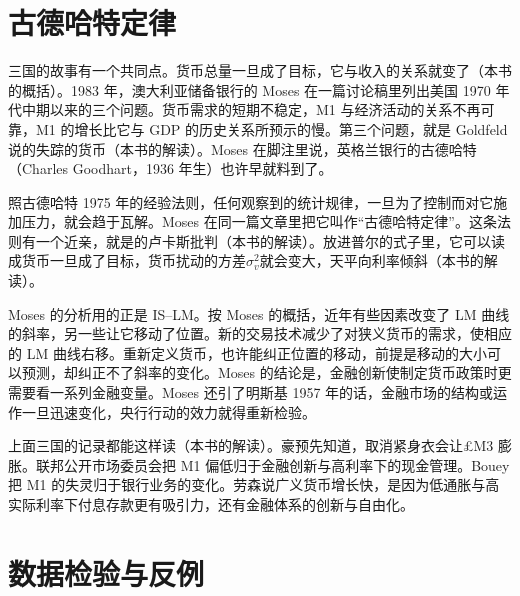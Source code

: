 \section{古德哈特定律}\label{sec:monetarism-goodhart}

三国的故事有一个共同点。货币总量一旦成了目标，它与收入的关系就变了（本书的概括）。1983 年，澳大利亚储备银行的 Moses 在一篇讨论稿里列出美国 1970 年代中期以来的三个问题\cite{moses1983}。货币需求的短期不稳定，M1 与经济活动的关系不再可靠，M1 的增长比它与 GDP 的历史关系所预示的慢\cite{moses1983}。第三个问题，就是 Goldfeld 说的失踪的货币（本书的解读）。Moses 在脚注里说，英格兰银行的古德哈特（Charles Goodhart，1936 年生）也许早就料到了\cite{moses1983,loc45}。

照古德哈特 1975 年的经验法则，任何观察到的统计规律，一旦为了控制而对它施加压力，就会趋于瓦解\cite{moses1983}。Moses 在同一篇文章里把它叫作“古德哈特定律”\cite{moses1983}。这条法则有一个近亲，就是的卢卡斯批判（本书的解读）。放进普尔的式子里，它可以读成货币一旦成了目标，货币扰动的方差$\sigma^{2}_{v}$就会变大，天平向利率倾斜（本书的解读）。

Moses 的分析用的正是 IS–LM\cite{moses1983}。按 Moses 的概括，近年有些因素改变了 LM 曲线的斜率，另一些让它移动了位置\cite{moses1983}。新的交易技术减少了对狭义货币的需求，使相应的 LM 曲线右移\cite{moses1983}。重新定义货币，也许能纠正位置的移动，前提是移动的大小可以预测，却纠正不了斜率的变化\cite{moses1983}。Moses 的结论是，金融创新使制定货币政策时更需要看一系列金融变量\cite{moses1983}。Moses 还引了明斯基 1957 年的话，金融市场的结构或运作一旦迅速变化，央行行动的效力就得重新检验\cite{moses1983}。

上面三国的记录都能这样读（本书的解读）。豪预先知道，取消紧身衣会让£M3 膨胀\cite{hansard1980}。联邦公开市场委员会把 M1 偏低归于金融创新与高利率下的现金管理\cite{fomc1982a}。Bouey 把 M1 的失灵归于银行业务的变化\cite{bouey1982a}。劳森说广义货币增长快，是因为低通胀与高实际利率下付息存款更有吸引力，还有金融体系的创新与自由化\cite{hansard1986}。

\section{数据检验与反例}\label{sec:monetarism-test}

